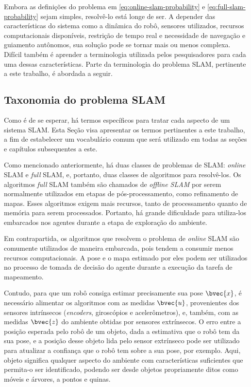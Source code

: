 Embora as definições do problema em \ref{eq:online-slam-probability} e 
\ref{eq:full-slam-probability} sejam simples, resolvê-lo está longe de ser. 
A depender das características do sistema como a dinâmica do robô, sensores utilizados, recursos computacionais disponíveis, restrição de tempo real e 
necessidade de navegação e guiamento autônomos, sua solução pode se tornar mais 
ou menos complexa. Difícil também é aprender a terminologia utilizada pelos 
pesquisadores para cada uma dessas características. Parte da terminologia do problema SLAM,
pertinente a este trabalho, é abordada a seguir.

\subsection*{Taxonomia do problema SLAM}
Como é de se esperar, há termos específicos para tratar cada aspecto de um 
sistema SLAM. Esta Seção visa apresentar os termos pertinentes a este trabalho, 
a fim de estabelecer um vocabulário comum que será utilizado em todas as seções 
e capítulos subsequentes a este.

Como mencionado anteriormente, há duas classes de problemas de SLAM: 
\textit{online} SLAM e \textit{full} SLAM, e, portanto, duas classes de 
algoritmos para resolvê-los. Os algoritmos \textit{full} SLAM também são chamados 
de \emph{offline SLAM} por serem normalmente utilizados em etapas de pós-processamento, como refinamento de mapas. Esses algoritmos exigem mais 
recursos, tanto de processamento quanto de memória para serem processados. 
Portanto, há grande dificuldade para utiliza-los embarcados nos agentes durante 
a etapa de exploração do ambiente.

Em contrapartida, os algoritmos que resolvem o problema de \textit{online} 
SLAM são comumente utilizados de maneira embarcada, pois tendem a 
consumir menos recursos computacionais. A pose e o mapa estimado por eles podem 
ser utilizados no processo de tomada de decisão do agente durante a execução da 
tarefa de mapeamento. 

Contudo, para que um robô consiga estimar precisamente sua pose $\bvec{x}$, é 
necessário alimentar os algoritmos com as medidas $\bvec{u}$, provenientes dos 
sensores intrínsecos (\textit{encoders}, giroscópios e acelerômetros), e, 
também, com as medidas $\bvec{z}$ do ambiente obtidas por sensores extrínsecos. O erro 
entre a posição esperada pelo robô de um objeto, dada a estimativa que o robô tem da sua pose, e a posição desse objeto lida pelo sensor extrínseco pode ser 
utilizado para atualizar a confiança que o robô tem sobre a sua pose, por 
exemplo. Aqui, objeto significa qualquer aspecto do ambiente com características 
suficientes que permita-o ser identificado, podendo ser desde objetos
propriamente ditos como móveis e árvores, a pontos e quinas.

